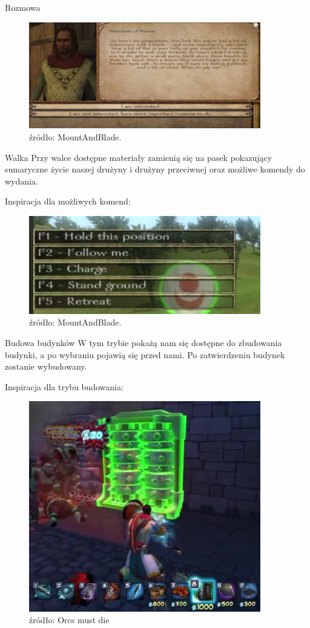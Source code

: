 Rozmowa 
\begin{figure}[htbp]
    \centering
    \includegraphics[width=0.9\textwidth]{images/ui/conversationMnB.png}
    \caption{źródło: MountAndBlade.}\label{fig:MountnBlade}
\end{figure}

Walka
Przy walce dostępne materiały zamienią się na pasek pokazujący sumaryczne życie naszej drużyny i drużyny przeciwnej oraz możliwe komendy do wydania.

Inspiracja dla możliwych komend:
\begin{figure}[htbp]
    \centering
    \includegraphics[width=0.9\textwidth]{images/ui/commandsMountBla.png}
    \caption{źródło: MountAndBlade.}\label{fig:MountnBlade}
\end{figure}


Budowa budynków
W tym trybie pokażą nam się dostępne do zbudowania budynki, a po wybraniu pojawią się przed nami. Po zatwierdzeniu budynek zostanie wybudowany.

Inspiracja dla trybu budowania:
\begin{figure}[htbp]
    \centering
    \includegraphics[width=0.9\textwidth]{images/ui/buoildingsOrcs.png}
    \caption{źródło: Orcs must die}\label{fig:Orcs}
\end{figure}

